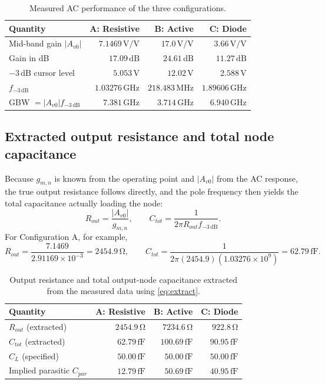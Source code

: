 \documentclass[12pt,a4paper]{article}
\newcommand{\U}[1]{\,\mathrm{#1}}
\begin{document}
\begin{table}[H]
\centering
\caption{Measured AC performance of the three configurations.}
\label{tab:acmeas}
\begin{tabular}{lrrr}
\toprule
\textbf{Quantity} & \textbf{A: Resistive} & \textbf{B: Active} & \textbf{C: Diode} \\
\midrule
Mid-band gain $|A_{v0}|$      & $7.1469\U{V/V}$ & $17.0\U{V/V}$    & $3.66\U{V/V}$ \\
Gain in dB                    & $17.09\U{dB}$   & $24.61\U{dB}$    & $11.27\U{dB}$ \\
$-3\U{dB}$ cursor level       & $5.053\U{V}$    & $12.02\U{V}$     & $2.588\U{V}$ \\
$f_{-3\U{dB}}$                & $1.03276\U{GHz}$& $218.483\U{MHz}$ & $1.89606\U{GHz}$ \\
GBW $=|A_{v0}|f_{-3\U{dB}}$   & $7.381\U{GHz}$  & $3.714\U{GHz}$   & $6.940\U{GHz}$ \\
\bottomrule
\end{tabular}
\end{table}

\subsection{Extracted output resistance and total node capacitance}
Because $g_{m,n}$ is known from the operating point and $|A_{v0}|$ from the AC
response, the true output resistance follows directly, and the pole frequency
then yields the total capacitance actually loading the node:
\begin{equation}
R_{out} = \frac{|A_{v0}|}{g_{m,n}},
\qquad
C_{tot} = \frac{1}{2\pi R_{out} f_{-3\U{dB}}} .
\label{eq:extract}
\end{equation}
For Configuration A, for example,
\[
R_{out} = \frac{7.1469}{2.91169\times10^{-3}} = 2454.9\U{\Omega},
\qquad
C_{tot} = \frac{1}{2\pi(2454.9)(1.03276\times10^{9})} = 62.79\U{fF}.
\]

\begin{table}[H]
\centering
\caption{Output resistance and total output-node capacitance extracted from the
measured data using \eqref{eq:extract}.}
\label{tab:extract}
\begin{tabular}{lrrr}
\toprule
\textbf{Quantity} & \textbf{A: Resistive} & \textbf{B: Active} & \textbf{C: Diode} \\
\midrule
$R_{out}$ (extracted)            & $2454.9\U{\Omega}$ & $7234.6\U{\Omega}$ & $922.8\U{\Omega}$ \\
$C_{tot}$ (extracted)            & $62.79\U{fF}$      & $100.69\U{fF}$     & $90.95\U{fF}$ \\
$C_L$ (specified)                & $50.00\U{fF}$      & $50.00\U{fF}$      & $50.00\U{fF}$ \\
Implied parasitic $C_{par}$      & $12.79\U{fF}$      & $50.69\U{fF}$      & $40.95\U{fF}$ \\
\bottomrule
\end{tabular}
\end{table}
\end{document}
